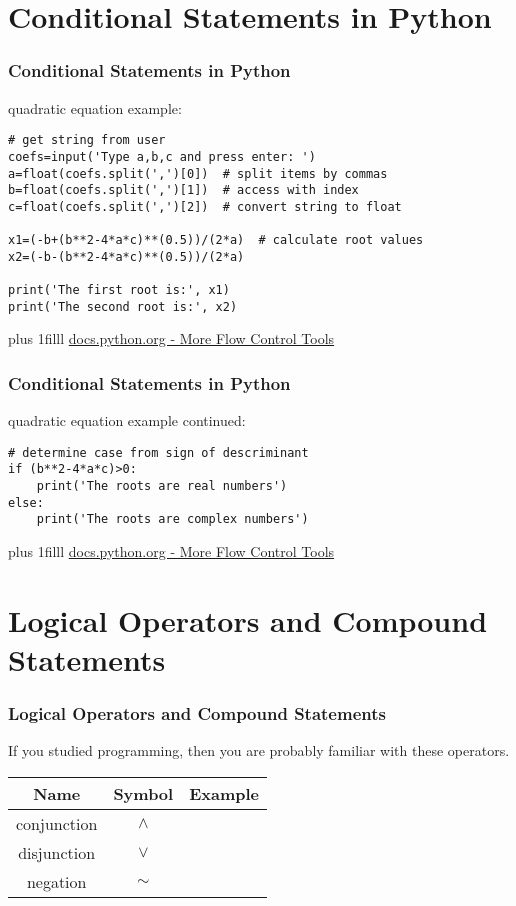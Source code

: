 \documentclass[fleqn]{beamer} %
\newcommand{\sectiontitleIV}{Conditional Statements in Python}
\newcommand{\sectiontitleV}{Logical Operators and Compound Statements}
\newcommand{\btVFill}{\vskip0pt plus 1filll}
\begin{document}
\section{\sectiontitleIV}	
\begin{frame}[label=sectionIV,containsverbatim] \small
\frametitle{\sectiontitleIV}    
quadratic equation example:
\begin{lstlisting}
# get string from user
coefs=input('Type a,b,c and press enter: ')  
a=float(coefs.split(',')[0])  # split items by commas 
b=float(coefs.split(',')[1])  # access with index
c=float(coefs.split(',')[2])  # convert string to float  

x1=(-b+(b**2-4*a*c)**(0.5))/(2*a)  # calculate root values
x2=(-b-(b**2-4*a*c)**(0.5))/(2*a)

print('The first root is:', x1)
print('The second root is:', x2)
\end{lstlisting}

\btVFill
{\tiny \href{https://docs.python.org/3/tutorial/controlflow.html}{docs.python.org - More Flow Control Tools}}

\end{frame}

\begin{frame}[label=sectionIV,containsverbatim] \small
\frametitle{\sectiontitleIV}    
quadratic equation example continued:
\begin{lstlisting}
# determine case from sign of descriminant
if (b**2-4*a*c)>0:
	print('The roots are real numbers')
else:
	print('The roots are complex numbers')
\end{lstlisting}

\btVFill
{\tiny \href{https://docs.python.org/3/tutorial/controlflow.html}{docs.python.org - More Flow Control Tools}}

\end{frame}

\section{\sectiontitleV}	
	\begin{frame}[label=sectionV,containsverbatim] \small
	\frametitle{\sectiontitleV}    
	
	If you studied programming, then you are probably familiar with these operators.  \vspace{5mm}\\
	
	\renewcommand*{\arraystretch}{1.5}
	\begin{tabular}{c|c|c} 
		Name&Symbol&Example\\ \hline
		conjunction&$\wedge$ & \\ \hline
		disjunction&$\vee$ & \\ \hline
		negation&$\sim$& \\ \hline

	\end{tabular}

	\end{frame}
	
\end{document}
